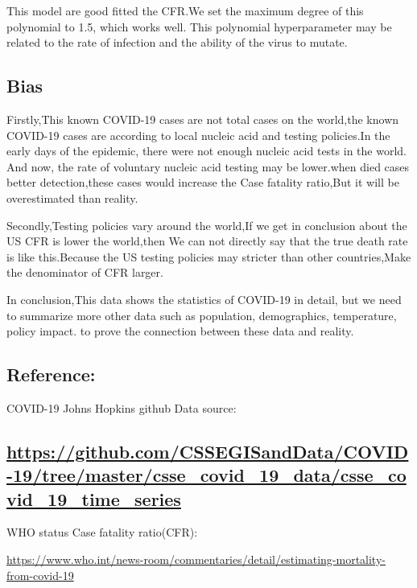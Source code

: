 \documentclass[
]{article}
\begin{document}
This model are good fitted the CFR.We set the maximum degree of this
polynomial to 1.5, which works well. This polynomial hyperparameter may
be related to the rate of infection and the ability of the virus to
mutate.

\hypertarget{bias}{%
\subsection{Bias}\label{bias}}

Firstly,This known COVID-19 cases are not total cases on the world,the
known COVID-19 cases are according to local nucleic acid and testing
policies.In the early days of the epidemic, there were not enough
nucleic acid tests in the world. And now, the rate of voluntary nucleic
acid testing may be lower.when died cases better detection,these cases
would increase the Case fatality ratio,But it will be overestimated than
reality.

Secondly,Testing policies vary around the world,If we get in conclusion
about the US CFR is lower the world,then We can not directly say that
the true death rate is like this.Because the US testing policies may
stricter than other countries,Make the denominator of CFR larger.

In conclusion,This data shows the statistics of COVID-19 in detail, but
we need to summarize more other data such as population, demographics,
temperature, policy impact. to prove the connection between these data
and reality.

\hypertarget{reference}{%
\subsection{Reference:}\label{reference}}

COVID-19 Johns Hopkins github Data source:

\hypertarget{httpsgithub.comcssegisanddatacovid-19treemastercsse_covid_19_datacsse_covid_19_time_series}{%
\subsection{\texorpdfstring{\url{https://github.com/CSSEGISandData/COVID-19/tree/master/csse_covid_19_data/csse_covid_19_time_series}}{https://github.com/CSSEGISandData/COVID-19/tree/master/csse\_covid\_19\_data/csse\_covid\_19\_time\_series}}\label{httpsgithub.comcssegisanddatacovid-19treemastercsse_covid_19_datacsse_covid_19_time_series}}

WHO status Case fatality ratio(CFR):

\url{https://www.who.int/news-room/commentaries/detail/estimating-mortality-from-covid-19}
\end{document}
